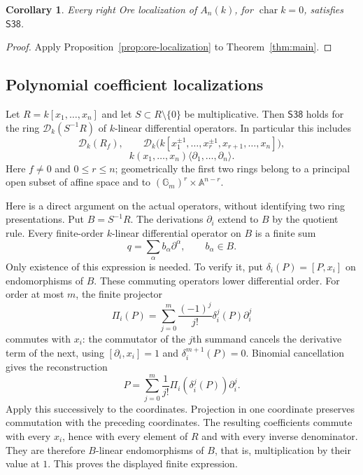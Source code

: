 \documentclass[11pt]{amsart}
\newtheorem{corollary}[theorem]{Corollary}
\theoremstyle{definition}
\begin{document}
\begin{corollary}\label{cor:localized-weyl}\label{sec:localized-weyl}
Every right Ore localization of $A_n(k)$, for $\operatorname{char}k=0$,
satisfies $\mathsf{S38}$.
\end{corollary}
\begin{proof}
Apply Proposition~\ref{prop:ore-localization} to Theorem~\ref{thm:main}.
\end{proof}

\subsection{Polynomial coefficient localizations}\label{sec:coefficient-open-examples}
Let $R=k[x_1,\ldots,x_n]$ and let $S\subset R\setminus\{0\}$ be multiplicative.
Then $\mathsf{S38}$ holds for the ring $\mathcal D_k(S^{-1}R)$ of
$k$-linear differential operators. In particular this includes
\[
 \mathcal D_k(R_f),\qquad
 \mathcal D_k\bigl(k[x_1^{\pm1},\ldots,x_r^{\pm1},x_{r+1},\ldots,x_n]\bigr),
\]
\[
 k(x_1,\ldots,x_n)\langle\partial_1,\ldots,\partial_n\rangle .
\]
Here $f\ne0$ and $0\le r\le n$; geometrically the first two rings belong to
a principal open subset of affine space and to
$(\mathbb G_m)^r\times\mathbb A^{n-r}$.

Here is a direct argument on the actual operators, without identifying two
ring presentations. Put $B=S^{-1}R$. The derivations $\partial_i$ extend to
$B$ by the quotient rule. Every finite-order $k$-linear differential operator
on $B$ is a finite sum
\[
 q=\sum_\alpha b_\alpha\partial^\alpha,\qquad b_\alpha\in B.
\]
Only existence of this expression is needed. To verify it, put
$\delta_i(P)=[P,x_i]$ on endomorphisms of $B$. These commuting operators
lower differential order. For order at most $m$, the finite projector
\[
 \Pi_i(P)=\sum_{j=0}^{m}\frac{(-1)^j}{j!}
             \delta_i^j(P)\partial_i^j
\]
commutes with $x_i$: the commutator of the $j$th summand cancels the
derivative term of the next, using $[\partial_i,x_i]=1$ and
$\delta_i^{m+1}(P)=0$. Binomial cancellation gives the reconstruction
\[
 P=\sum_{j=0}^{m}\frac{1}{j!}\Pi_i(\delta_i^j(P))\partial_i^j.
\]
Apply this successively to the coordinates. Projection in one coordinate
preserves commutation with the preceding coordinates. The resulting
coefficients commute with every $x_i$, hence with every element of $R$
and with every inverse denominator. They are therefore $B$-linear
endomorphisms of $B$, that is, multiplication by their value at $1$.
This proves the displayed finite expression.
\end{document}
